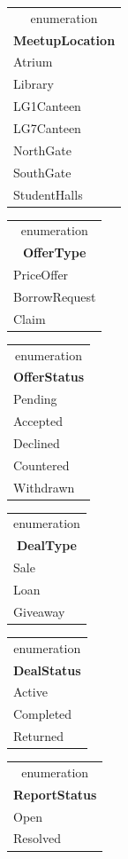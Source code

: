 \documentclass[10pt,a4paper]{article}
\begin{document}
{\begin{tabular}[t]{|l|}\hline\multicolumn{1}{|c|}{\tiny\guillemotleft{}enumeration\guillemotright{}}\\[-2pt]\multicolumn{1}{|c|}{\textbf{MeetupLocation}}\\\hline Atrium\\ Library\\ LG1Canteen\\ LG7Canteen\\ NorthGate\\ SouthGate\\ StudentHalls\\\hline\end{tabular}

\medskip\noindent
\begin{tabular}[t]{|l|}\hline\multicolumn{1}{|c|}{\tiny\guillemotleft{}enumeration\guillemotright{}}\\[-2pt]\multicolumn{1}{|c|}{\textbf{OfferType}}\\\hline PriceOffer\\ BorrowRequest\\ Claim\\\hline\end{tabular}\hfill \begin{tabular}[t]{|l|}\hline\multicolumn{1}{|c|}{\tiny\guillemotleft{}enumeration\guillemotright{}}\\[-2pt]\multicolumn{1}{|c|}{\textbf{OfferStatus}}\\\hline Pending\\ Accepted\\ Declined\\ Countered\\ Withdrawn\\\hline\end{tabular}\hfill \begin{tabular}[t]{|l|}\hline\multicolumn{1}{|c|}{\tiny\guillemotleft{}enumeration\guillemotright{}}\\[-2pt]\multicolumn{1}{|c|}{\textbf{DealType}}\\\hline Sale\\ Loan\\ Giveaway\\\hline\end{tabular}\hfill \begin{tabular}[t]{|l|}\hline\multicolumn{1}{|c|}{\tiny\guillemotleft{}enumeration\guillemotright{}}\\[-2pt]\multicolumn{1}{|c|}{\textbf{DealStatus}}\\\hline Active\\ Completed\\ Returned\\\hline\end{tabular}\hfill \begin{tabular}[t]{|l|}\hline\multicolumn{1}{|c|}{\tiny\guillemotleft{}enumeration\guillemotright{}}\\[-2pt]\multicolumn{1}{|c|}{\textbf{ReportStatus}}\\\hline Open\\ Resolved\\\hline\end{tabular}\hfill\mbox{}
}
\end{document}
